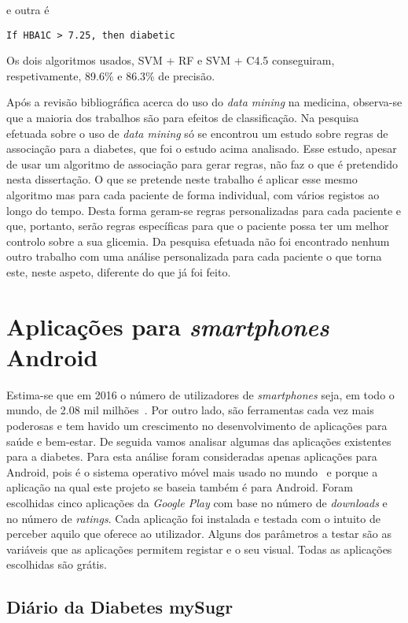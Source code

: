 e outra é

\begin{lstlisting}
If HBA1C > 7.25, then diabetic
\end{lstlisting}
Os dois algoritmos usados, SVM + RF e SVM + C4.5 conseguiram, respetivamente, 89.6\% e 86.3\% de precisão.

Após a revisão bibliográfica acerca do uso do \textit{data mining} na medicina, observa-se que a maioria dos trabalhos são para efeitos de classificação. Na pesquisa efetuada sobre o uso de \textit{data mining} só se encontrou um estudo sobre regras de associação para a diabetes, que foi o estudo acima analisado. Esse estudo, apesar de usar um algoritmo de associação para gerar regras, não faz o que é pretendido nesta dissertação. 
O que se pretende neste trabalho é aplicar esse mesmo algoritmo mas para cada paciente de forma individual, com vários registos ao longo do tempo. Desta forma geram-se regras personalizadas para cada paciente e que, portanto, serão regras específicas para que o paciente possa ter um melhor controlo sobre a sua glicemia. Da pesquisa efetuada não foi encontrado nenhum outro trabalho com uma análise personalizada para cada paciente o que torna este, neste aspeto, diferente do que já foi feito.


\section{Aplicações para \textit{smartphones} Android}

Estima-se que em 2016 o número de utilizadores de \textit{smartphones} seja, em todo o mundo, de 2.08 mil milhões~\cite{users}.
Por outro lado, são ferramentas cada vez mais poderosas e tem havido um crescimento no desenvolvimento de aplicações para saúde e bem-estar. De seguida vamos analisar algumas das aplicações existentes para a diabetes. Para esta análise foram consideradas apenas aplicações para Android, pois é o sistema operativo móvel mais usado no mundo~\cite{mercadomovel} e porque a aplicação na qual este projeto se baseia também é para Android. Foram escolhidas cinco aplicações da \textit{Google Play} com base no número de \textit{downloads} e no número de \textit{ratings}. Cada aplicação foi instalada e testada com o intuito de perceber aquilo que oferece ao utilizador. Alguns dos parâmetros a testar são as variáveis que as aplicações permitem registar e o seu visual. Todas as aplicações escolhidas são grátis.

\subsection{Diário da Diabetes mySugr}

